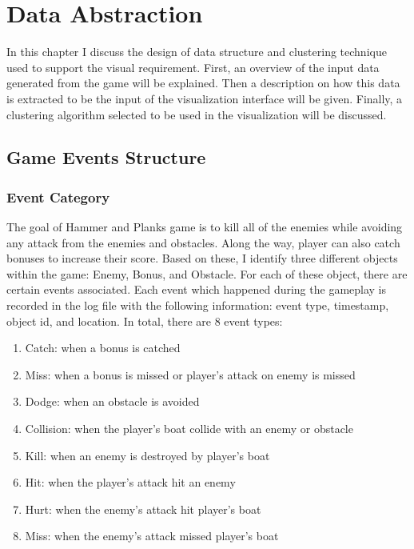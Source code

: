 \chapter{Data Abstraction}

In this chapter I discuss the design of data structure and clustering technique used to support the visual requirement. First, an overview of the input data generated from the game will be explained. Then a description on how this data is extracted to be the input of the visualization interface will be given. Finally, a clustering algorithm selected to be used in the visualization will be discussed.

\section{Game Events Structure}
\subsection{Event Category}
The goal of Hammer and Planks game is to kill all of the enemies while avoiding any attack from the enemies and obstacles\cite{diloreto}. Along the way, player can also catch bonuses to increase their score. Based on these, I identify three different objects within the game: Enemy, Bonus, and Obstacle. For each of these object, there are certain events associated. Each event which happened during the gameplay is recorded in the log file with the following information: event type, timestamp, object id, and location. In total, there are 8 event types:
\newcommand{\events}[2]{$#1 _ #2$}	
\begin{enumerate}[label=({\arabic*})]
\item Catch: when a bonus is catched
\item Miss: when a bonus is missed or player's attack on enemy is missed
\item Dodge: when an obstacle is avoided
\item Collision: when the player's boat collide with an enemy or obstacle
\item Kill: when an enemy is destroyed by player's boat
\item Hit: when the player's attack hit an enemy
\item Hurt: when the enemy's attack hit player's boat
\item Miss: when the enemy's attack missed player's boat
\end{enumerate}

